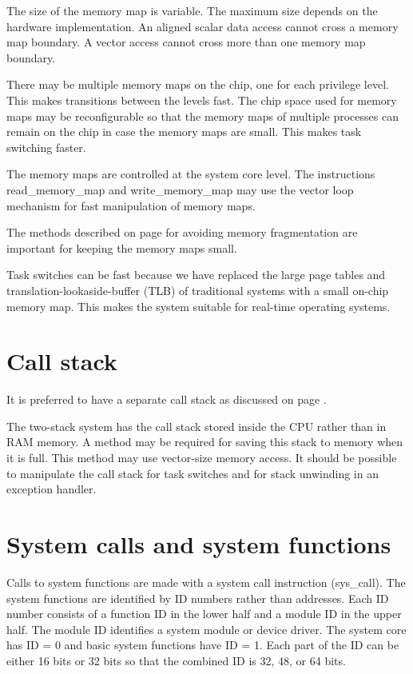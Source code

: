 \documentclass[forwardcom.tex]{subfiles}
\begin{document}
The size of the memory map is variable. The maximum size depends on the hardware implementation. 
An aligned scalar data access cannot cross a memory map boundary. A vector access cannot cross more than one memory map boundary.
\vv

There may be multiple memory maps on the chip, one for each privilege level. This makes transitions between the levels fast. The chip space used for memory maps may be reconfigurable so that the memory maps of multiple processes can remain on the chip in case the memory maps are small. This makes task switching faster.
\vv

The memory maps are controlled at the system core level. The instructions read\_memory\_map and write\_memory\_map may use the vector loop mechanism for fast manipulation of memory maps.
\vv

The methods described on page \pageref{memoryManagement} for avoiding memory fragmentation are important for keeping the memory maps small. 
\vv

Task switches can be fast because we have replaced the large page tables and translation-lookaside-buffer (TLB) of traditional systems with a small on-chip memory map. This makes the system suitable for real-time operating systems.

\section{Call stack}
It is preferred to have a separate call stack as discussed on page \pageref{callStackAlternatives}. \vv

The two-stack system has the call stack stored inside the CPU rather than in RAM memory. A method may be required for saving this stack to memory when it is full. This method may use vector-size memory access. It should be possible to manipulate the call stack for task switches and for stack unwinding in an exception handler.

\section{System calls and system functions} \label{systemCallIDSystem}
Calls to system functions are made with a system call instruction (sys\_call). The system functions are identified by ID numbers rather than addresses. Each ID number consists of a function ID in the lower half and a module ID in the upper half. The module ID identifies a system module or device driver. The system core has ID = 0 and basic system functions have ID = 1. Each part of the ID can be either 16 bits or 32 bits so that the combined ID is 32, 48, or 64 bits. 
\vv
\end{document}
